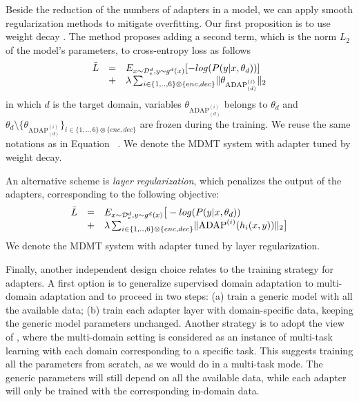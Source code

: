 Beside the reduction of the numbers of adapters in a model, we can apply smooth regularization methods to mitigate overfitting. Our first proposition is to use weight decay \citep{Krogh91simple}. The method proposes adding a second term, which is the norm $L_2$ of the model's parameters, to cross-entropy loss as follows
\begin{equation*}
  \begin{array}{rcl}
  \bar{L} & = &  E_{x \sim \mathcal{D}_e^d, y \sim g^d(x)} [-log(P(y|x,\theta_d))] \\
    & + & \lambda  \sum_{i \in \{1,..,6\} \otimes \{enc, dec\}} \normL{\theta_{\operatorname{ADAP}^{(i)}_{(d)}}}
  \end{array}
\end{equation*}
in which $d$ is the target domain, variables $\theta_{\operatorname{ADAP}^{(i)}_{(d)}}$ belongs to $\theta_d$ and $\theta_d \setminus \{ \theta_{\operatorname{ADAP}^{(i)}_{(d)}} \}_{i \in \{1,..,6\} \otimes \{enc, dec\}}$ are frozen during the training. We reuse the same notations as in Equation ~. We denote  the MDMT system with adapter tuned by weight decay.

An alternative scheme is \emph{layer regularization}, which penalizes the output of the adapters, corresponding to the following objective:
\begin{equation*}
  \begin{array}{rcl}
    \bar{L} & = &  E_{x \sim \mathcal{D}_e^d, y \sim g^d(x)} \big[-log(P(y|x,\theta_d)) \\
    & + & \lambda \sum_{i \in \{1,..,6\} \otimes \{enc, dec\}} \normL{\operatorname{ADAP}^{(i)}(h_i(x,y))} \big]
  \end{array}
\end{equation*}
We denote  the MDMT system with adapter tuned by layer regularization.

Finally, another independent design choice relates to the training strategy for adapters. A first option is to generalize supervised domain adaptation to multi-domain adaptation and to proceed in two steps: (a) train a generic model with all the available data; (b) train each adapter layer with domain-specific data, keeping the generic model parameters unchanged. Another strategy is to adopt the view of \citet{Dredze08online}, where the multi-domain setting is considered as an instance of multi-task learning \cite{Caruana97multitask} with each domain corresponding to a specific task. This suggests training all the parameters from scratch, as we would do in a multi-task mode. The generic parameters will still depend on all the available data, while each adapter will only be trained with the corresponding in-domain data.

